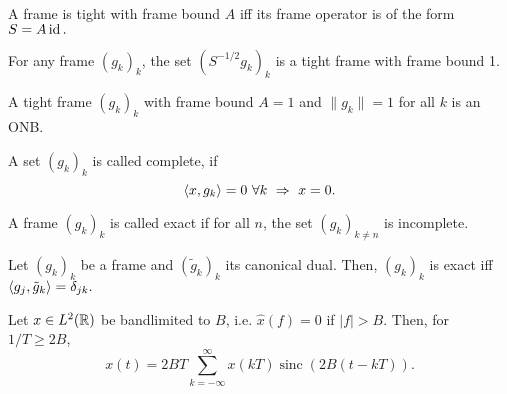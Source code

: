 \begin{boxtheorem}
    A frame is tight with frame bound $A$ iff its frame operator is of the
    form $S=A\operatorname*{id}.$
\end{boxtheorem}

\begin{boxtheorem}
    For any frame $(g_k)_k$, the set $(S^{-1/2}g_k)_k$ 
    is a tight frame with frame bound 1.
\end{boxtheorem}

\begin{boxtheorem}
    A tight frame $(g_k)_k$ with frame bound $A=1$ and $\|g_k\|=1$
    for all $k$ is an ONB.
\end{boxtheorem}

\begin{boxdefinition}
    A set $(g_k)_k$ is called complete, if 
    $$\la x,g_k\ra =0 \ \forall k \ \imp \ x=0.$$
\end{boxdefinition}

\begin{boxdefinition}
    A frame $(g_k)_k$ is called exact if for all $n$, the set 
    $(g_k)_{k\neq n}$ is incomplete.
\end{boxdefinition}

\begin{boxtheorem} [Exactness]
    Let $(g_k)_k$ be a frame and $(\tilde g_k)_k$ its canonical dual. Then,
    $(g_k)_k$ is exact iff $\langle g_j,\tilde g_k\rangle=\delta_{jk}.$ 
\end{boxtheorem}

\begin{boxtheorem}
    Let $x\in L^2(\mathbb{R})$ be bandlimited to $B$, i.e. $\hat x(f)=0$ if 
    $|f|> B$. Then, for $1/T\geq2B$, 
    $$x(t)=2BT\sum_{k=-\infty}^\infty x(kT)\operatorname{sinc}(2B(t-kT)).$$
\end{boxtheorem}
